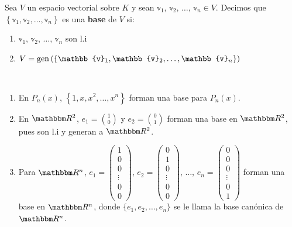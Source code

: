 \begin{definition}
    Sea $V$ un espacio vectorial sobre $K$ y sean $\mathbb{v}_1$, $\mathbb{v}_2$, $\dots$, $\mathbb{v}_n \in V$. Decimos que $\left\{ \mathbb{v}_1, \mathbb{v}_2, \dots, \mathbb{v}_n \right\}$ es una \textbf{base} de $V$ si:
    \begin{enumerate}[label=\roman*)]
        \item $\mathbb{v}_1$, $\mathbb{v}_2$, $\dots$, $\mathbb{v}_n$ son l.i
        \item $V = \Gen \left( \{ \mathbb{v}_1, \mathbb{v}_2, \dots, \mathbb{v}_n \} \right)$
    \end{enumerate}
\end{definition}

\begin{examples}~
    \begin{enumerate}
        \item En $P_n(x)$, $\left\{ 1, x, x^2, \dots, x^n \right\}$ forman una base para $P_n(x)$.
        \item En $\RR[2]$, $\displaystyle e_1 = \binom{1}{0}$ y $\displaystyle e_2 = \binom{0}{1}$ forman una base en $\RR[2]$, pues son l.i y generan a $\RR[2]$.
        \item Para $\RR[n]$, $\displaystyle e_1 = \left( \begin{array}{c} 1 \\ 0 \\ 0 \\ \vdots \\ 0 \\ 0 \end{array} \right)$, $\displaystyle e_2 = \left( \begin{array}{c} 0 \\ 1 \\ 0 \\ \vdots \\ 0 \\ 0 \end{array} \right)$, $\dots$, $\displaystyle e_n = \left( \begin{array}{c} 0 \\ 0 \\ 0 \\ \vdots \\ 0 \\ 1 \end{array} \right)$ forman una base en $\RR[n]$, donde $\{ e_1, e_2, \dots, e_n \}$ se le llama la base canónica de $\RR[n]$.
    \end{enumerate}
\end{examples}

